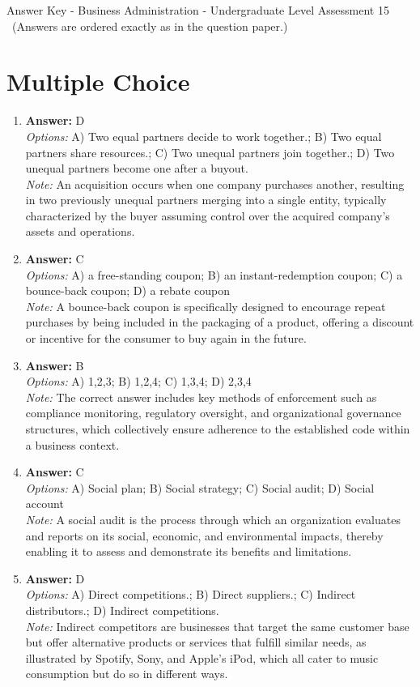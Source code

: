 \documentclass[12pt]{article}
\begin{document}
\begin{center}
Answer Key - Business Administration - Undergraduate Level Assessment 15 \
\small (Answers are ordered exactly as in the question paper.)
\end{center}

\section*{Multiple Choice}
\begin{enumerate}[label=\arabic*.]
\item \textbf{Answer:} D
\\ \textit{Options:} A) Two equal partners decide to work together.; B) Two equal partners share resources.; C) Two unequal partners join together.; D) Two unequal partners become one after a buyout.
\\ \textit{Note:} An acquisition occurs when one company purchases another, resulting in two previously unequal partners merging into a single entity, typically characterized by the buyer assuming control over the acquired company's assets and operations.
\item \textbf{Answer:} C
\\ \textit{Options:} A) a free-standing coupon; B) an instant-redemption coupon; C) a bounce-back coupon; D) a rebate coupon
\\ \textit{Note:} A bounce-back coupon is specifically designed to encourage repeat purchases by being included in the packaging of a product, offering a discount or incentive for the consumer to buy again in the future.
\item \textbf{Answer:} B
\\ \textit{Options:} A) 1,2,3; B) 1,2,4; C) 1,3,4; D) 2,3,4
\\ \textit{Note:} The correct answer includes key methods of enforcement such as compliance monitoring, regulatory oversight, and organizational governance structures, which collectively ensure adherence to the established code within a business context.
\item \textbf{Answer:} C
\\ \textit{Options:} A) Social plan; B) Social strategy; C) Social audit; D) Social account
\\ \textit{Note:} A social audit is the process through which an organization evaluates and reports on its social, economic, and environmental impacts, thereby enabling it to assess and demonstrate its benefits and limitations.
\item \textbf{Answer:} D
\\ \textit{Options:} A) Direct competitions.; B) Direct suppliers.; C) Indirect distributors.; D) Indirect competitions.
\\ \textit{Note:} Indirect competitors are businesses that target the same customer base but offer alternative products or services that fulfill similar needs, as illustrated by Spotify, Sony, and Apple's iPod, which all cater to music consumption but do so in different ways.
\end{enumerate}
\end{document}
